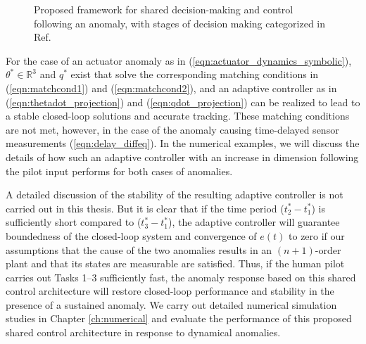\begin{figure}[h]

	\caption{Proposed framework for shared decision-making and control following an anomaly, with stages of decision making categorized in Ref.~\cite{parasuraman2000model}}
	\label{fig:response_flow}
\end{figure}

For the case of an actuator anomaly as in (\ref{eqn:actuator_dynamics_symbolic}), $\theta^* \in \mathbb{R}^3$ and $q^*$ exist that solve the corresponding matching conditions in (\ref{eqn:matchcond1}) and (\ref{eqn:matchcond2}), and an adaptive controller as in (\ref{eqn:thetadot_projection}) and (\ref{eqn:qdot_projection}) can be realized to lead to a stable closed-loop solutions and accurate tracking. These matching conditions are not met, however, in the case of the anomaly causing time-delayed sensor measurements (\ref{eqn:delay_diffeq}). In the numerical examples, we will discuss the details of how such an adaptive controller with an increase in dimension following the pilot input performs for both cases of anomalies. 

A detailed discussion of the stability of the resulting adaptive controller is not carried out in this thesis. But it is clear that if the time period ($t_2^* - t_1^*$) is sufficiently short compared to ($t_3^* - t_1^*$), the adaptive controller will guarantee boundedness of the closed-loop system and convergence of $e(t)$ to zero if our assumptions that the cause of the two anomalies results in an $(n+1)$-order plant and that its states are measurable are satisfied. Thus, if the human pilot carries out Tasks 1--3 sufficiently fast, the anomaly response based on this shared control architecture will restore closed-loop performance and stability in the presence of a sustained anomaly. We carry out detailed numerical simulation studies in Chapter \ref{ch:numerical} and evaluate the performance of this proposed shared control architecture in response to dynamical anomalies.
